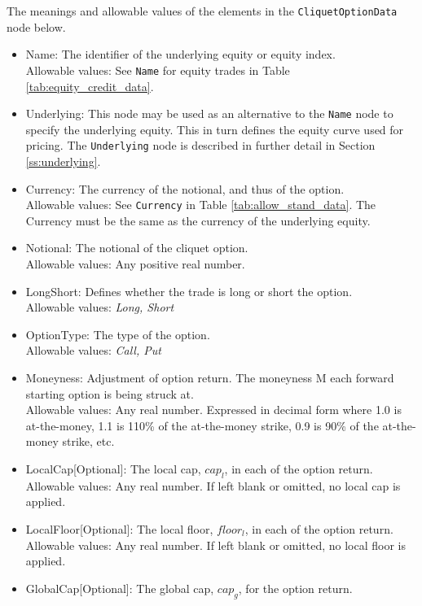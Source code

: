 The meanings and allowable values of the elements in the \lstinline!CliquetOptionData! node below.

\begin{itemize}
	\item Name: The identifier of the underlying equity or equity index. \\
	Allowable values: See \lstinline!Name! for equity trades in Table \ref{tab:equity_credit_data}.	
	\item Underlying:  This node may be used as an alternative to the \lstinline!Name! node to specify the underlying equity. This in turn defines the equity 		curve used for pricing. The \lstinline!Underlying! node is described in further detail in Section \ref{ss:underlying}. \\
	\item Currency: The currency of the notional, and thus of the option.  \\
	Allowable values: See \lstinline!Currency! in Table \ref{tab:allow_stand_data}. The Currency must be the same as the currency of the underlying equity.
	\item Notional: The notional of the cliquet option.\\
	Allowable values: Any positive real number.
	\item LongShort: Defines whether the trade is long or short the option. \\
	Allowable values: \emph{Long, Short}
	\item OptionType: The type of the option. \\
	Allowable values: \emph{Call, Put}
	\item Moneyness: Adjustment of option return. The moneyness M each forward starting option is being struck at.\\
	Allowable values: Any real number. Expressed in decimal form where 1.0 is at-the-money, 1.1 is 110\% of the at-the-money strike, 0.9  is 90\% of the at-the-money strike, etc.
	\item LocalCap[Optional]: The local cap, $cap_{l}$, in each of the option return. \\
	Allowable values: Any real number. If left blank or omitted, no local cap is applied.
	\item LocalFloor[Optional]: The local floor, $floor_{l}$, in each of the option return. \\
	Allowable values: Any real number. If left blank or omitted, no local floor is applied.
	\item GlobalCap[Optional]: The global cap, $cap_{g}$, for the option return. \\

\end{itemize}
